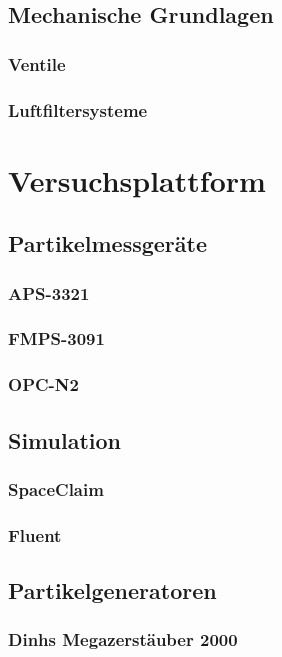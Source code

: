 \section{Mechanische Grundlagen}
\subsection{Ventile}
\subsection{Luftfiltersysteme}


\chapter{Versuchsplattform}\label{ch:platform}
\section{Partikelmessger\"{a}te}
\subsection{APS-3321}
\subsection{FMPS-3091}
\subsection{OPC-N2}

\section{Simulation}
\subsection{SpaceClaim}
\subsection{Fluent}

\section{Partikelgeneratoren}
\subsection{Dinhs Megazerst\"{a}uber 2000}
